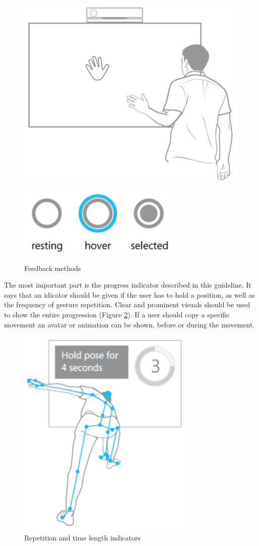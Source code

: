 \begin{figure}[htb]
	\centering
	\begin{minipage}[t]{0.45\linewidth}
		\centering
		\includegraphics[width=0.5\linewidth]{Pictures/hciGuidelinesFeedbackCursor}
		\label{fig:hciGuidelinesFeedbackCursor}
	\end{minipage}
	\hfill
	\begin{minipage}[t]{0.45\linewidth}
		\centering
		\includegraphics[width=0.5\linewidth]{Pictures/hciGuidelinesFeedbackControl}
		\label{fig:hciGuidelinesFeedbackControl}
	\end{minipage}
	\caption{Feedback methods \cite{MicrosoftHIG2014-mh}}
	\label{fig:hciGuidelinesFeedback}
\end{figure}

The most important part is the progress indicator described in this guideline. It says that an idicator should be given if the user has to hold a position, as well as the frequency of gesture repetition. Clear and prominent visuals should be used to show the entire progression (Figure \ref{fig:hciGuidelinesProgressIndicator}). If a user should copy a specific movement an avatar or animation can be shown, before or during the movement.

\begin{figure}[htb]
	\centering
	\begin{minipage}[t]{1\linewidth}
		\centering
		\includegraphics[width=0.3\linewidth]{Pictures/hciGuidelinesProgressIndicator}
		\caption{Repetition and time length indicators}
		\label{fig:hciGuidelinesProgressIndicator}
	\end{minipage}
\end{figure}

